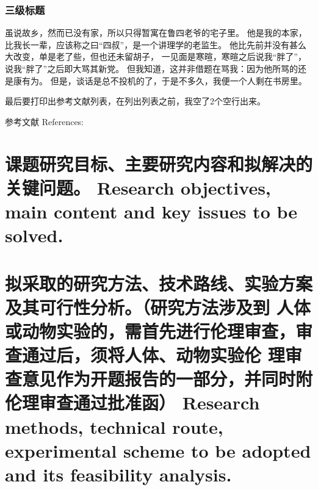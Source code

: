 \documentclass[a4paper,zihao=-4,AutoFakeBold]{ctexart}
\def\mymfdsplitlinewidth{0.8pt}
\newcommand{\splitframe}{
    \mdfsubtitle[
        subtitleaboveline=true,
        subtitleabovelinewidth=\mymfdsplitlinewidth,
        subtitlebelowskip=0.2\baselineskip,
        subtitleinneraboveskip=0pt,
        subtitleinnerbelowskip=0pt,
    ]{}
}
\begin{document}
\begin{mdframed}[
    style=mymdfstyle,
]
\subsubsection{三级标题}\label{subsub}

虽说故乡，然而已没有家，所以只得暂寓在鲁四老爷的宅子里。
他是我的本家，比我长一辈，应该称之曰“四叔”，是一个讲理学的老监生。
他比先前并没有甚么大改变，单是老了些，但也还未留胡子，
一见面是寒暄，寒暄之后说我“胖了”，说我“胖了”之后即大骂其新党。
但我知道，这并非借题在骂我：因为他所骂的还是康有为。
但是，谈话是总不投机的了，于是不多久，我便一个人剩在书房里。

最后要打印出参考文献列表，在列出列表之前，我空了2个空行出来。

\vspace{2\baselineskip}

{
\renewcommand{\bibfont}{\small}
\noindent 参考文献 References: 
    \printbibliography[heading=none]

}

\newpage %

\section{课题研究目标、主要研究内容和拟解决的关键问题。\newline
    Research objectives, main content and key issues to be solved.}

\zhlipsum %

\newpage %

\vspace{-0.5ex} %
\section{拟采取的研究方法、技术路线、实验方案及其可行性分析。（研究方法涉及到\break
人体或动物实验的，需首先进行伦理审查，审查通过后，须将人体、动物实验伦\vspace{0.3ex}\break %
理审查意见作为开题报告的一部分，并同时附伦理审查通过批准函）\newline
Research methods, technical route, experimental scheme to be adopted and its feasibility analysis.}

\zhlipsum %

\newpage %


\end{mdframed}
\end{document}
